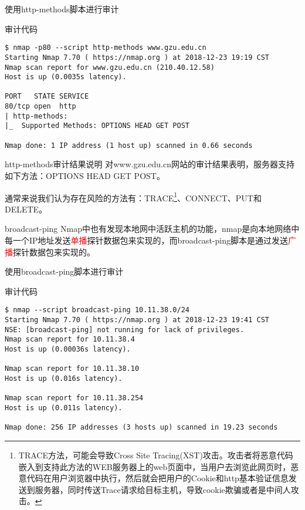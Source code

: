 \documentclass{beamer}
\begin{document}
\begin{frame}[fragile]{使用http-methods脚本进行审计}
\begin{block}{审计代码}
\begin{verbatim}
$ nmap -p80 --script http-methods www.gzu.edu.cn
Starting Nmap 7.70 ( https://nmap.org ) at 2018-12-23 19:19 CST
Nmap scan report for www.gzu.edu.cn (210.40.12.58)
Host is up (0.0035s latency).

PORT   STATE SERVICE
80/tcp open  http
| http-methods: 
|_  Supported Methods: OPTIONS HEAD GET POST

Nmap done: 1 IP address (1 host up) scanned in 0.66 seconds
\end{verbatim}
\end{block}
\end{frame}

\begin{frame}[fragile]{http-methods审计结果说明}
对www.gzu.edu.cn网站的审计结果表明，服务器支持如下方法：OPTIONS HEAD GET POST。


通常来说我们认为存在风险的方法有：TRACE\footnote{TRACE方法，可能会导致Cross Site Tracing(XST)攻击。攻击者将恶意代码嵌入到支持此方法的WEB服务器上的web页面中，当用户去浏览此网页时，恶意代码在用户浏览器中执行，然后就会把用户的Cookie和http基本验证信息发送到服务器，同时传送Trace请求给目标主机，导致cookie欺骗或者是中间人攻击。}、CONNECT、PUT和DELETE。

\end{frame}
\begin{frame}
\end{frame}

\begin{frame}{broadcast-ping}
Nmap中也有发现本地网中活跃主机的功能，nmap是向本地网络中每一个IP地址发送\textcolor{red}{单播}探针数据包来实现的，而broadcast-ping脚本是通过发送\textcolor{red}{广播}探针数据包来实现的。
\end{frame}
\begin{frame}[fragile]{使用broadcast-ping脚本进行审计}
\begin{block}{审计代码}
\begin{verbatim}
$ nmap --script broadcast-ping 10.11.38.0/24
Starting Nmap 7.70 ( https://nmap.org ) at 2018-12-23 19:41 CST
NSE: [broadcast-ping] not running for lack of privileges.
Nmap scan report for 10.11.38.4
Host is up (0.00036s latency).

Nmap scan report for 10.11.38.10
Host is up (0.016s latency).

Nmap scan report for 10.11.38.254
Host is up (0.011s latency).

Nmap done: 256 IP addresses (3 hosts up) scanned in 19.23 seconds
\end{verbatim}
\end{block}
\end{frame}
\end{document}
